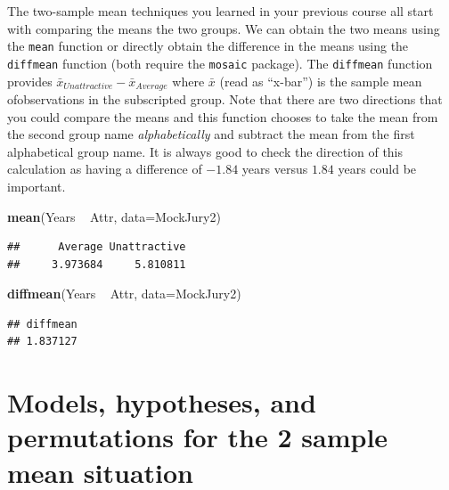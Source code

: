 \documentclass[]{book}
\newenvironment{Shaded}{\begin{snugshade}}{\end{snugshade}}
\newcommand{\KeywordTok}[1]{\textcolor[rgb]{0.13,0.29,0.53}{\textbf{{#1}}}}
\newcommand{\DataTypeTok}[1]{\textcolor[rgb]{0.13,0.29,0.53}{{#1}}}
\newcommand{\StringTok}[1]{\textcolor[rgb]{0.31,0.60,0.02}{{#1}}}
\newcommand{\NormalTok}[1]{{#1}}
\begin{document}
The two-sample mean techniques you learned in your previous course all
start with comparing the means the two groups. We can obtain the two
means using the \texttt{mean} function or directly obtain the difference
in the means using the \texttt{diffmean} function (both require the
\texttt{mosaic} package). The \texttt{diffmean} function provides
\(\bar{x}_{Unattractive} - \bar{x}_{Average}\) where \(\bar{x}\) (read
as ``x-bar'') is the sample mean ofobservations in the subscripted
group. Note that there are two directions that you could compare the
means and this function chooses to take the mean from the second group
name \emph{alphabetically} and subtract the mean from the first
alphabetical group name. It is always good to check the direction of
this calculation as having a difference of \(-1.84\) years versus
\(1.84\) years could be important.

\begin{Shaded}
\begin{Highlighting}[]
\KeywordTok{mean}\NormalTok{(Years ~}\StringTok{ }\NormalTok{Attr, }\DataTypeTok{data=}\NormalTok{MockJury2)}
\end{Highlighting}
\end{Shaded}

\begin{verbatim}
##      Average Unattractive 
##     3.973684     5.810811
\end{verbatim}

\begin{Shaded}
\begin{Highlighting}[]
\KeywordTok{diffmean}\NormalTok{(Years ~}\StringTok{ }\NormalTok{Attr, }\DataTypeTok{data=}\NormalTok{MockJury2)}
\end{Highlighting}
\end{Shaded}

\begin{verbatim}
## diffmean 
## 1.837127
\end{verbatim}

\section{Models, hypotheses, and permutations for the 2 sample mean
situation}\label{section2-3}
\end{document}
